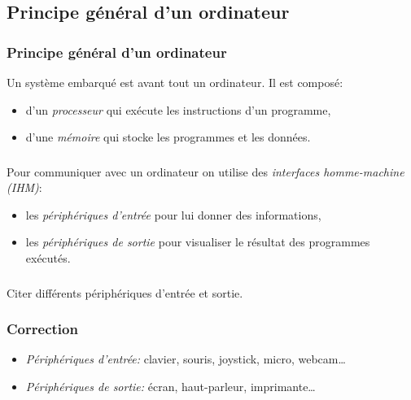 \documentclass[svgnames,11pt]{beamer}
\begin{document}
\subsection{Principe général d'un ordinateur}
\begin{frame}
    \frametitle{Principe général d'un ordinateur}

    Un système embarqué est avant tout un ordinateur. Il est composé:
    \begin{itemize}
        \item<1-> d'un \emph{processeur} qui exécute les instructions d'un programme,
        \item<2-> d'une \emph{mémoire} qui stocke les programmes et les données.
    \end{itemize}

\end{frame}
\begin{frame}
    \frametitle{}

    Pour communiquer avec un ordinateur on utilise des \emph{interfaces homme-machine (IHM)}:
    \begin{itemize}
        \item<1-> les \emph{périphériques d'entrée} pour lui donner des informations,
        \item<2-> les \emph{périphériques de sortie} pour visualiser le résultat des programmes exécutés.
    \end{itemize}

\end{frame}
\begin{frame}
    \frametitle{}
    \begin{activite}
        Citer différents périphériques d'entrée et sortie.
    \end{activite}


\end{frame}
\begin{frame}
    \frametitle{Correction}
    \begin{itemize}
        \item \emph{Périphériques d'entrée:} clavier, souris, joystick, micro, webcam\dots
        \item \emph{Périphériques de sortie: }écran, haut-parleur, imprimante\dots
    \end{itemize}


\end{frame}
\end{document}
